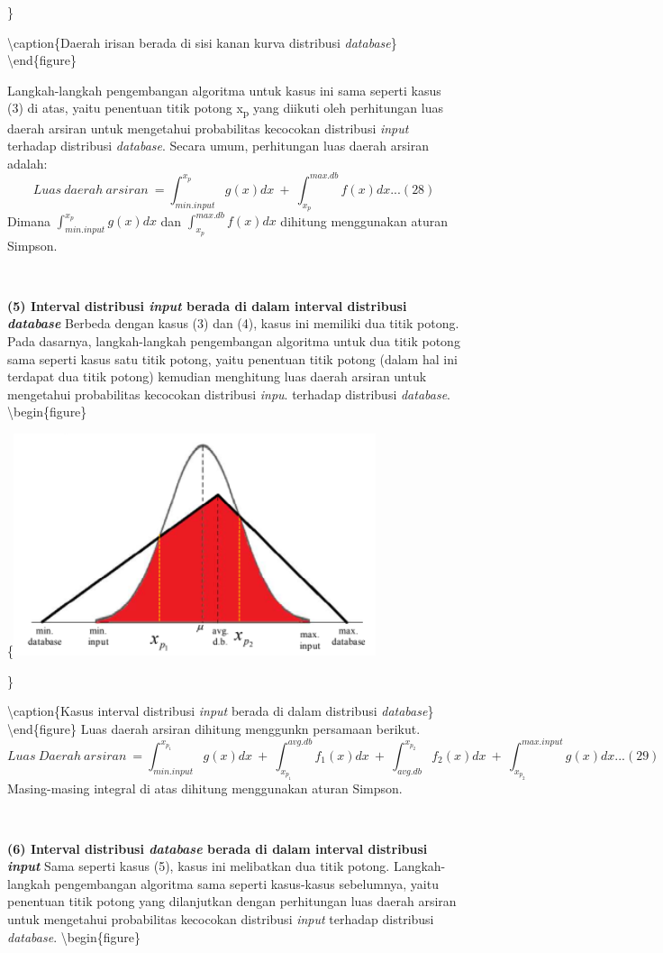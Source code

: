 \documentclass[
]{book}
\begin{document}
\}

\textbackslash caption\{Daerah irisan berada di sisi kanan kurva distribusi \emph{database}\}\label{fig:unnamed-chunk-36}
\textbackslash end\{figure\}

Langkah-langkah pengembangan algoritma untuk kasus ini sama seperti kasus (3) di atas, yaitu penentuan titik potong x\textsubscript{p} yang diikuti oleh perhitungan luas daerah arsiran untuk mengetahui probabilitas kecocokan distribusi \emph{input} terhadap distribusi \emph{database}. Secara umum, perhitungan luas daerah arsiran adalah: \[Luas\ daerah\ arsiran\ = \int_{min.input}^{x_p}g(x)dx\ +\ \int_{x_p}^{max.db}f(x)dx...(28) \]
Dimana \(\int_{min.input}^{x_p}g(x)dx\) dan \(\int_{x_p}^{max.db}f(x)dx\) dihitung menggunakan aturan Simpson.

~

\textbf{(5) Interval distribusi \emph{input} berada di dalam interval distribusi \emph{database}}
Berbeda dengan kasus (3) dan (4), kasus ini memiliki dua titik potong. Pada dasarnya, langkah-langkah pengembangan algoritma untuk dua titik potong sama seperti kasus satu titik potong, yaitu penentuan titik potong (dalam hal ini terdapat dua titik potong) kemudian menghitung luas daerah arsiran untuk mengetahui probabilitas kecocokan distribusi \emph{inpu}. terhadap distribusi \emph{database}.
\textbackslash begin\{figure\}

\{\centering \includegraphics[width=0.5\linewidth]{images/screening/interval_dalam}

\}

\textbackslash caption\{Kasus interval distribusi \emph{input} berada di dalam distribusi \emph{database}\}\label{fig:unnamed-chunk-37}
\textbackslash end\{figure\}
Luas daerah arsiran dihitung menggunkn persamaan berikut. \[Luas\ Daerah\ arsiran\ = \int_{min.input}^{x_{p_1}}g(x)dx\ +\ \int_{x_{p_1}}^{avg.db}f_1(x)dx\ +\ \int_{avg.db}^{x_{p_2}}f_2(x)dx\ +\ \int_{x_{p_2}}^{max.input}g(x)dx...(29)\]
Masing-masing integral di atas dihitung menggunakan aturan Simpson.

~

\textbf{(6) Interval distribusi \emph{database} berada di dalam interval distribusi \emph{input}}
Sama seperti kasus (5), kasus ini melibatkan dua titik potong. Langkah-langkah pengembangan algoritma sama seperti kasus-kasus sebelumnya, yaitu penentuan titik potong yang dilanjutkan dengan perhitungan luas daerah arsiran untuk mengetahui probabilitas kecocokan distribusi \emph{input} terhadap distribusi \emph{database}.
\textbackslash begin\{figure\}
\end{document}
